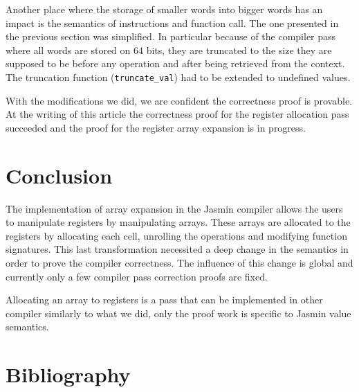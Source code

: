 \documentclass{article}
\begin{document}
\smallskip

Another place where the storage of smaller words into bigger words has an impact
is the semantics of instructions and function call. The one presented in the
previous section was simplified. In particular because of the compiler pass
where all words are stored on 64 bits, they are truncated to the size they are
supposed to be before any operation and after being retrieved from the context.
The truncation function (\texttt{truncate\_val}) had to be extended to undefined
values.

With the modifications we did, we are confident the correctness proof is
provable. At the writing of this article the correctness proof for the register
allocation pass succeeded and the proof for the register array expansion is in
progress.

\section{Conclusion}\label{sec:ccl}

The implementation of array expansion in the Jasmin compiler allows the users to
manipulate registers by manipulating arrays. These arrays are allocated to the
registers by allocating each cell, unrolling the operations and modifying
function signatures. This last transformation necessited a deep change in the
semantics in order to prove the compiler correctness. The influence of this
change is global and currently only a few compiler pass correction proofs are
fixed.

Allocating an array to registers is a pass that can be implemented in other
compiler similarly to what we did, only the proof work is specific to Jasmin
value semantics.

\section{Bibliography}


\end{document}
